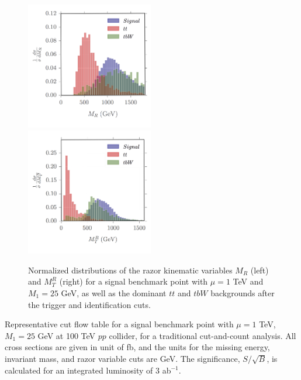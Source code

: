 \documentclass[a4paper,11pt]{article}
\begin{document}
\begin{figure}[h]
\centering
\includegraphics[trim = {0.3cm 0.6cm 0.1cm 0}, clip, width=0.496\textwidth]{images/mR_copy.png}
\includegraphics[trim = {0.3cm 0.6cm 0.1cm 0}, clip, width=0.496\textwidth]{images/mTR_copy.png}
\caption{Normalized distributions of the razor kinematic variables $M_R$
  (left) and $M_T^R$ (right) for  a signal benchmark point with $\mu=1$ TeV and $M_1=25$ GeV,
  as well as the dominant $tt$ and $tbW$ backgrounds
  after the trigger and identification cuts.}
\label{fig:razor_histos}
\end{figure}

\begin{table}[h]
  \centering
  
  \caption{Representative cut flow table for a signal benchmark point with $\mu=1$ TeV,
    $M_1 = 25$ GeV at 100  TeV $pp$ collider, for a traditional cut-and-count analysis. All cross sections
    are given in unit of fb, and the units for the missing energy, invariant
    mass, and razor variable cuts are GeV. The significance, $S/\sqrt{B}$, is
    calculated for an integrated luminosity of 3 ab$^{-1}$.  }
\label{tab:cc_cutflowtable}
\end{table}
\end{document}
